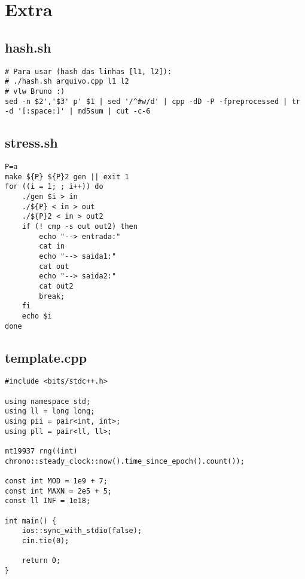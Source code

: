 \documentclass[12pt, a4paper, twoside]{article}
\begin{document}
\pagebreak


%
%

\section{Extra}

\subsection{hash.sh}
\begin{lstlisting}
# Para usar (hash das linhas [l1, l2]):
# ./hash.sh arquivo.cpp l1 l2
# vlw Bruno :)
sed -n $2','$3' p' $1 | sed '/^#w/d' | cpp -dD -P -fpreprocessed | tr -d '[:space:]' | md5sum | cut -c-6
\end{lstlisting}

\subsection{stress.sh}
\begin{lstlisting}
P=a
make ${P} ${P}2 gen || exit 1
for ((i = 1; ; i++)) do
	./gen $i > in
	./${P} < in > out
	./${P}2 < in > out2
	if (! cmp -s out out2) then
		echo "--> entrada:"
		cat in
		echo "--> saida1:"
		cat out
		echo "--> saida2:"
		cat out2
		break;
	fi
	echo $i
done
\end{lstlisting}

\subsection{template.cpp}
\begin{lstlisting}
#include <bits/stdc++.h>

using namespace std;
using ll = long long;
using pii = pair<int, int>;
using pll = pair<ll, ll>;

mt19937 rng((int) chrono::steady_clock::now().time_since_epoch().count());

const int MOD = 1e9 + 7;
const int MAXN = 2e5 + 5;
const ll INF = 1e18;

int main() {
	ios::sync_with_stdio(false);
	cin.tie(0);

	return 0;
}
\end{lstlisting}
\end{document}
